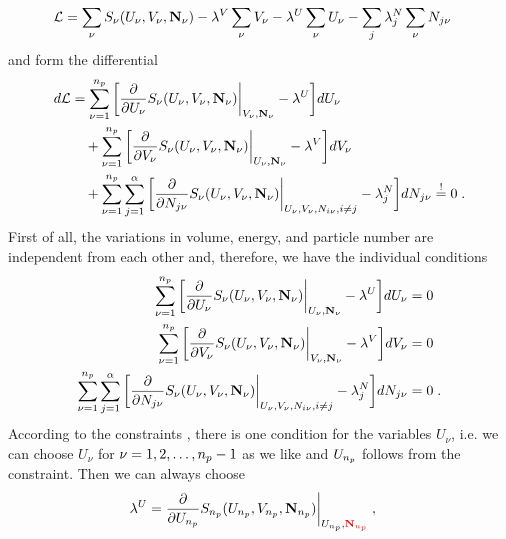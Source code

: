 %
\begin{align}\label{eq:}
{\cal L} &= \sum_{\nu} S_{\nu}(U_{\nu},V_{\nu},\mathbf N_{\nu})
-\lambda^{V} \sum_{\nu} V_{\nu}
-\lambda^{U} \sum_{\nu} U_{\nu}
-\sum_{j}\lambda^{N}_{j}\sum_{\nu} N_{j\nu}
\end{align}
%
and form the differential
\begin{subequations}\label{eq:}
\begin{align}
d{\cal L} &= \sum_{\nu=1}^{n_{p} } 
\bigg[\frac{\partial }{\partial U_{\nu}}S_{\nu}(U_{\nu},V_{\nu},\mathbf N_{\nu})\bigg|_{V_{\nu},\mathbf N_{\nu}} -\lambda^{U}\bigg]dU_{\nu}\\
&\quad +\sum_{\nu=1}^{n_{p} } \bigg[\frac{\partial }{\partial V_{\nu}}S_{\nu}(U_{\nu},V_{\nu},\mathbf N_{\nu})\bigg|_{U_{\nu},\mathbf N_{\nu}} -\lambda^{V}\bigg]dV_{\nu}\\
&\quad +\sum_{\nu=1}^{n_{p} } \sum_{j=1}^{\alpha}\bigg[\frac{\partial }{\partial N_{j\nu}}S_{\nu}(U_{\nu},V_{\nu},\mathbf N_{\nu}) \bigg|_{U_{\nu},V_{\nu},N_{i\nu},i\ne j}-\lambda^{N}_{j}\bigg]dN_{j\nu}
\overset{!}{=}0\;.
\end{align}
\end{subequations}
%
First of all, the variations in volume, energy, and particle number are independent from each other
and, therefore, we have the individual conditions
\begin{subequations}\label{eq:constraint:2}
\begin{align}
\label{eq:constraint:2a}
\sum_{\nu=1}^{n_{p} } 
\bigg[\frac{\partial }{\partial U_{\nu}}S_{\nu}(U_{\nu},V_{\nu},\mathbf N_{\nu}) \bigg|_{U_{\nu},\mathbf N_{\nu}}-\lambda^{U}\bigg]dU_{\nu}&=0\\
\sum_{\nu=1}^{n_{p} } \bigg[\frac{\partial }{\partial V_{\nu}}S_{\nu}(U_{\nu},V_{\nu},\mathbf N_{\nu})\bigg|_{V_{\nu},\mathbf N_{\nu}} -\lambda^{V}\bigg]dV_{\nu} &=0\\
\sum_{\nu=1}^{n_{p} } \sum_{j=1}^{\alpha} \bigg[\frac{\partial }{\partial N_{j\nu}}S_{\nu}(U_{\nu},V_{\nu},\mathbf N_{\nu})\bigg|_{U_{\nu},V_{\nu},N_{i\nu},i\ne j} -\lambda^{N}_{j}\bigg]dN_{j\nu} &=0\;.
\end{align}
\end{subequations}
According to the constraints , there is one condition for the variables $U_{\nu}$, i.e. we can choose $U_{\nu}$ for $\nu=1,2,\ldots,n_{p} -1$ as we like and $U_{n_{p} }$
follows from the constraint. Then we can always choose
%
\begin{align}\label{eq:constr:nu}
\lambda^{U} &=\frac{\partial }{\partial U_{n_{p} }}
S_{n_{p} }(U_{n_{p} },V_{n_{p} },\mathbf N_{n_{p} })\bigg|_{U_{n_{p} },\textcolor{red}{\mathbf N_{n_{p} } }} \;,
\end{align}
